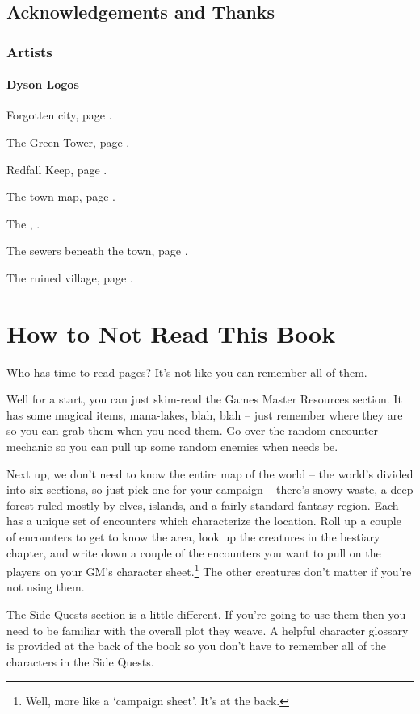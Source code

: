 
\section*{Acknowledgements and Thanks}

\subsection*{Artists}

\subsubsection{Dyson Logos}

Forgotten city, page \pageref{lost_city_map}.

The Green Tower, page \pageref{green_tower_map}.

Redfall Keep, page \pageref{redfall_keep_map}.

The town map, page \pageref{town_map}.

The , \pageref{mincing_pig_map}.

The sewers beneath the town, page \pageref{sewer_map}.

The ruined village, page \pageref{ruined_village_map}.


\chapter*{How to Not Read This Book}

Who has time to read \pageref{lastpage} pages?  It's not like you can remember all of them.

Well for a start, you can just skim-read the Games Master Resources section.  It has some magical items, mana-lakes, blah, blah -- just remember where they are so you can grab them when you need them.  Go over the random encounter mechanic so you can pull up some random enemies when needs be.

Next up, we don't need to know the entire map of the world -- the world's divided into six sections, so just pick one for your campaign -- there's snowy waste, a deep forest ruled mostly by elves, islands, and a fairly standard fantasy region.  Each has a unique set of encounters which characterize the location.  Roll up a couple of encounters to get to know the area, look up the creatures in the bestiary chapter, and write down a couple of the encounters you want to pull on the players on your GM's character sheet.\footnote{Well, more like a `campaign sheet'.  It's at the back.}  The other creatures don't matter if you're not using them.

The Side Quests section is a little different.  If you're going to use them then you need to be familiar with the overall plot they weave.  A helpful character glossary is provided at the back of the book so you don't have to remember all of the characters in the Side Quests.


